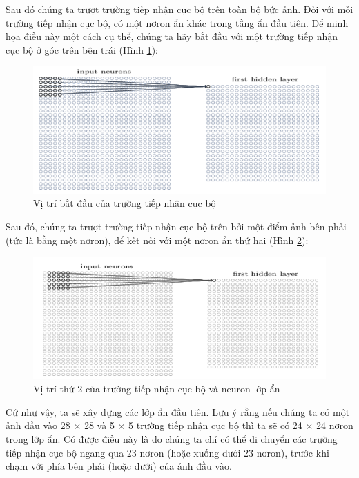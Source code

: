 Sau đó chúng ta trượt trường tiếp nhận cục bộ trên toàn bộ bức ảnh. Đối với 
mỗi trường tiếp nhận cục bộ, có một nơron ẩn khác trong tầng ẩn đầu tiên. Để minh 
họa điều này một cách cụ thể, chúng ta hãy bắt đầu với một trường tiếp nhận cục 
bộ ở góc trên bên trái (Hình \ref{fig:truongtiepnhancucbo}):
\begin{figure}[H]
	\centering
	\includegraphics[width=1\linewidth]{images/truongtiepnhancucbo.png}
	\caption{Vị trí bắt đầu của trường tiếp nhận cục bộ}
	\label{fig:truongtiepnhancucbo}
\end{figure}
Sau đó, chúng ta trượt trường tiếp nhận cục bộ trên bởi một điểm ảnh bên 
phải (tức là bằng một nơron), để kết nối với một nơron ẩn thứ hai (Hình \ref{fig:truongtiepnhancucbo2}):
\begin{figure}[H]
	\centering
	\includegraphics[width=1\linewidth]{images/truongtiepnhancucbo2.png}
	\caption{Vị trí thứ 2 của trường tiếp nhận cục bộ và neuron lớp ẩn}
	\label{fig:truongtiepnhancucbo2}
\end{figure}
Cứ như vậy, ta sẽ xây dựng các lớp ẩn đầu tiên. Lưu ý rằng nếu chúng ta có một ảnh đầu vào 28 × 28 và 5 × 5 trường tiếp nhận cục bộ thì ta sẽ có 24 × 24 nơron trong lớp ẩn. Có được điều này là do chúng ta chỉ có thể di chuyển các trường tiếp nhận cục bộ ngang qua 23 nơron (hoặc xuống dưới 23 nơron), trước khi chạm với phía bên phải (hoặc dưới) của ảnh đầu vào.
 
